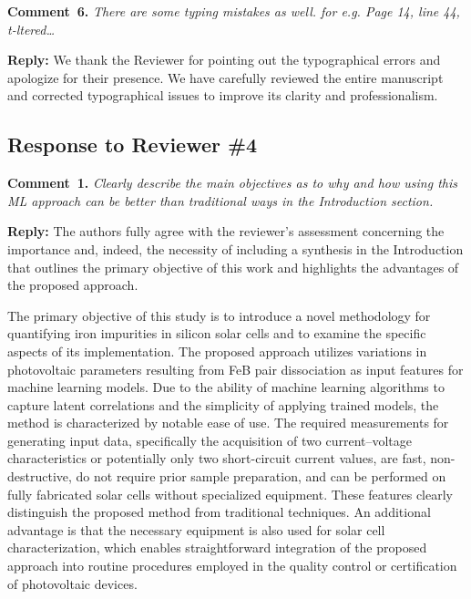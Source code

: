 \documentclass[a4paper,fleqn]{cas-sc}
\begin{document}




\vspace{1cm}
\noindent
\textcolor[rgb]{0.00,0.50,1.00}{\textbf{Comment~6.}}
\emph{There are some typing mistakes as well. for e.g. Page 14, line 44, t-ltered…}

\noindent
\textcolor[rgb]{0.51,0.00,0.00}{\textbf{Reply:}}
We thank the Reviewer for pointing out the typographical errors and apologize for their presence.
We have carefully reviewed the entire manuscript and corrected typographical issues to improve its clarity and  professionalism.


\vspace{1cm}
\subsection*{Response to Reviewer \#4 }

\noindent
\textcolor[rgb]{0.00,0.50,1.00}{\textbf{Comment~1.}}
\emph{Clearly describe the main objectives as to why and how using this ML approach can be better than traditional ways in the Introduction section.}

\noindent
\textcolor[rgb]{0.51,0.00,0.00}{\textbf{Reply:}}
The authors fully agree with the reviewer's assessment concerning the importance and,
indeed, the necessity of including a synthesis in the Introduction
that outlines the primary objective of this work and highlights the advantages of the proposed approach.


The primary objective of this study is to introduce a novel methodology for quantifying iron impurities
in silicon solar cells and to examine the specific aspects of its implementation.
The proposed approach utilizes variations in photovoltaic parameters resulting
from FeB pair dissociation as input features for machine learning models.
Due to the ability of machine learning algorithms to capture latent correlations and the simplicity of applying trained models,
the method is characterized by notable ease of use.
The required measurements for generating input data,
specifically the acquisition of two current–voltage characteristics or potentially
only two short-circuit current values, are fast, non-destructive, do not require prior sample preparation,
and can be performed on fully fabricated solar cells without specialized equipment.
These features clearly distinguish the proposed method from traditional techniques.
An additional advantage is that the necessary equipment is also used for solar cell characterization,
which enables straightforward integration of the proposed approach into routine procedures
employed in the quality control or certification of photovoltaic devices.
\end{document}
